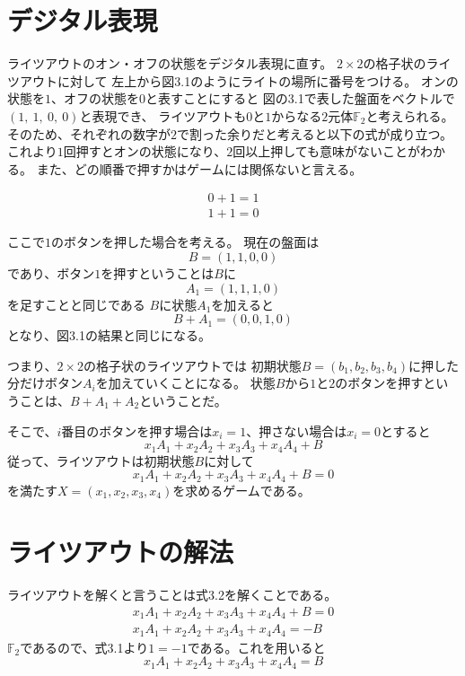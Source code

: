 \documentclass[uplatex,dvipdfmx]{ujreport}
\begin{document}
\section{デジタル表現}
ライツアウトのオン・オフの状態をデジタル表現に直す。
$2 \times 2$の格子状のライツアウトに対して
左上から図3.1のようにライトの場所に番号をつける。
オンの状態を$1$、オフの状態を$0$と表すことにすると
図の3.1で表した盤面をベクトルで$(1,\ 1,\ 0,\ 0)$と表現でき、
ライツアウトも$0$と$1$からなる$2$元体$\mathbb{F}_2$と考えられる。\\

そのため、それぞれの数字が$2$で割った余りだと考えると以下の式が成り立つ。
これより$1$回押すとオンの状態になり、$2$回以上押しても意味がないことがわかる。
また、どの順番で押すかはゲームには関係ないと言える。

 \begin{equation}
  \begin{split}
    0+1=1\\
   1+1=0  
  \end{split}
 \end{equation}

ここで$1$のボタンを押した場合を考える。
現在の盤面は
\[
 B=(1,1,0,0)
\]
であり、ボタン$1$を押すということは$B$に
\[
 A_1=(1,1,1,0)
\]
を足すことと同じである
$B$に状態$A_1$を加えると
\[
 B+A_1=(0,0,1,0)
\]
となり、図3.1の結果と同じになる。

つまり、$2\times2$の格子状のライツアウトでは
初期状態$B=(b_1,b_2,b_3,b_4)$に押した分だけボタン$A_i$を加えていくことになる。
状態$B$から$1$と$2$のボタンを押すということは、$B+A_1+A_2$ということだ。

そこで、$i$番目のボタンを押す場合は$x_i=1$、押さない場合は$x_i=0$とすると
\[
 x_1A_1+x_2A_2+x_3A_3+x_4A_4+B
\]
従って、ライツアウトは初期状態$B$に対して
\begin{equation}
  x_1A_1+x_2A_2+x_3A_3+x_4A_4+B=0
\end{equation}
を満たす$X=(x_1,x_2,x_3,x_4)$を求めるゲームである。

\section{ライツアウトの解法}
ライツアウトを解くと言うことは式3.2を解くことである。
\[
\begin{split}
  x_1A_1+x_2A_2+x_3A_3+x_4A_4+B=0\\
  x_1A_1+x_2A_2+x_3A_3+x_4A_4=-B
\end{split}
\]
$\mathbb{F}_2$であるので、式3.1より$1=-1$である。これを用いると
\begin{equation}
 x_1A_1+x_2A_2+x_3A_3+x_4A_4=B
\end{equation}
\end{document}
